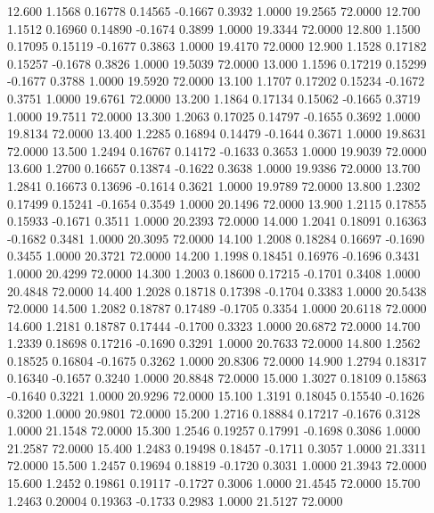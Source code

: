   12.600   1.1568   0.16778   0.14565  -0.1667   0.3932   1.0000  19.2565  72.0000
  12.700   1.1512   0.16960   0.14890  -0.1674   0.3899   1.0000  19.3344  72.0000
  12.800   1.1500   0.17095   0.15119  -0.1677   0.3863   1.0000  19.4170  72.0000
  12.900   1.1528   0.17182   0.15257  -0.1678   0.3826   1.0000  19.5039  72.0000
  13.000   1.1596   0.17219   0.15299  -0.1677   0.3788   1.0000  19.5920  72.0000
  13.100   1.1707   0.17202   0.15234  -0.1672   0.3751   1.0000  19.6761  72.0000
  13.200   1.1864   0.17134   0.15062  -0.1665   0.3719   1.0000  19.7511  72.0000
  13.300   1.2063   0.17025   0.14797  -0.1655   0.3692   1.0000  19.8134  72.0000
  13.400   1.2285   0.16894   0.14479  -0.1644   0.3671   1.0000  19.8631  72.0000
  13.500   1.2494   0.16767   0.14172  -0.1633   0.3653   1.0000  19.9039  72.0000
  13.600   1.2700   0.16657   0.13874  -0.1622   0.3638   1.0000  19.9386  72.0000
  13.700   1.2841   0.16673   0.13696  -0.1614   0.3621   1.0000  19.9789  72.0000
  13.800   1.2302   0.17499   0.15241  -0.1654   0.3549   1.0000  20.1496  72.0000
  13.900   1.2115   0.17855   0.15933  -0.1671   0.3511   1.0000  20.2393  72.0000
  14.000   1.2041   0.18091   0.16363  -0.1682   0.3481   1.0000  20.3095  72.0000
  14.100   1.2008   0.18284   0.16697  -0.1690   0.3455   1.0000  20.3721  72.0000
  14.200   1.1998   0.18451   0.16976  -0.1696   0.3431   1.0000  20.4299  72.0000
  14.300   1.2003   0.18600   0.17215  -0.1701   0.3408   1.0000  20.4848  72.0000
  14.400   1.2028   0.18718   0.17398  -0.1704   0.3383   1.0000  20.5438  72.0000
  14.500   1.2082   0.18787   0.17489  -0.1705   0.3354   1.0000  20.6118  72.0000
  14.600   1.2181   0.18787   0.17444  -0.1700   0.3323   1.0000  20.6872  72.0000
  14.700   1.2339   0.18698   0.17216  -0.1690   0.3291   1.0000  20.7633  72.0000
  14.800   1.2562   0.18525   0.16804  -0.1675   0.3262   1.0000  20.8306  72.0000
  14.900   1.2794   0.18317   0.16340  -0.1657   0.3240   1.0000  20.8848  72.0000
  15.000   1.3027   0.18109   0.15863  -0.1640   0.3221   1.0000  20.9296  72.0000
  15.100   1.3191   0.18045   0.15540  -0.1626   0.3200   1.0000  20.9801  72.0000
  15.200   1.2716   0.18884   0.17217  -0.1676   0.3128   1.0000  21.1548  72.0000
  15.300   1.2546   0.19257   0.17991  -0.1698   0.3086   1.0000  21.2587  72.0000
  15.400   1.2483   0.19498   0.18457  -0.1711   0.3057   1.0000  21.3311  72.0000
  15.500   1.2457   0.19694   0.18819  -0.1720   0.3031   1.0000  21.3943  72.0000
  15.600   1.2452   0.19861   0.19117  -0.1727   0.3006   1.0000  21.4545  72.0000
  15.700   1.2463   0.20004   0.19363  -0.1733   0.2983   1.0000  21.5127  72.0000
